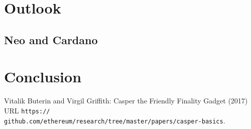 \documentclass[12pt,a4paper,draft]{article}
\begin{document}
\section{Outlook}

\subsection{Neo and Cardano}

\section{Conclusion}

\begin{thebibliography}{9}

  Vitalik Buterin and Virgil Griffith:
  Casper the Friendly Finality Gadget (2017) URL \texttt{https://\\github.com/ethereum/research/tree/master/papers/casper-basics}.

\end{thebibliography}
\end{document}
